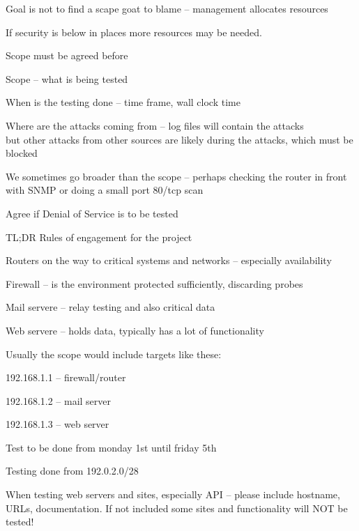 \documentclass[Screen16to9,17pt]{foils}
\begin{document}
Goal is not to find a scape goat to blame -- management allocates resources

If security is below in places more resources may be needed.



\begin{list1}
\item Scope must be agreed before
\begin{list2}
\item Scope -- what is being tested
\item When is the testing done -- time frame, wall clock time
\item Where are the attacks coming from -- log files will contain the attacks\\
but other attacks from other sources are likely during the attacks, which must be blocked
\item We sometimes go broader than the scope -- perhaps checking the router in front with SNMP or doing a small port 80/tcp scan
\item Agree if Denial of Service is to be tested
\item TL;DR Rules of engagement for the project
\end{list2}
\end{list1}



\begin{list2}
\item Routers on the way to critical systems and networks -- especially availability
\item Firewall -- is the environment protected sufficiently, discarding probes
\item Mail servere -- relay testing and also critical data
\item Web servere -- holds data, typically has a lot of functionality
\end{list2}



\begin{list1}
\item Usually the scope would include targets like these:
\begin{list2}
\item 192.168.1.1 -- firewall/router
\item 192.168.1.2 -- mail server
\item 192.168.1.3 -- web server
\item Test to be done from monday 1st until friday 5th
\item Testing done from 192.0.2.0/28
\end{list2}
\item When testing web servers and sites, especially API -- please include hostname, URLs, documentation. If not included some sites and functionality will NOT be tested!
\end{list1}
\end{document}
